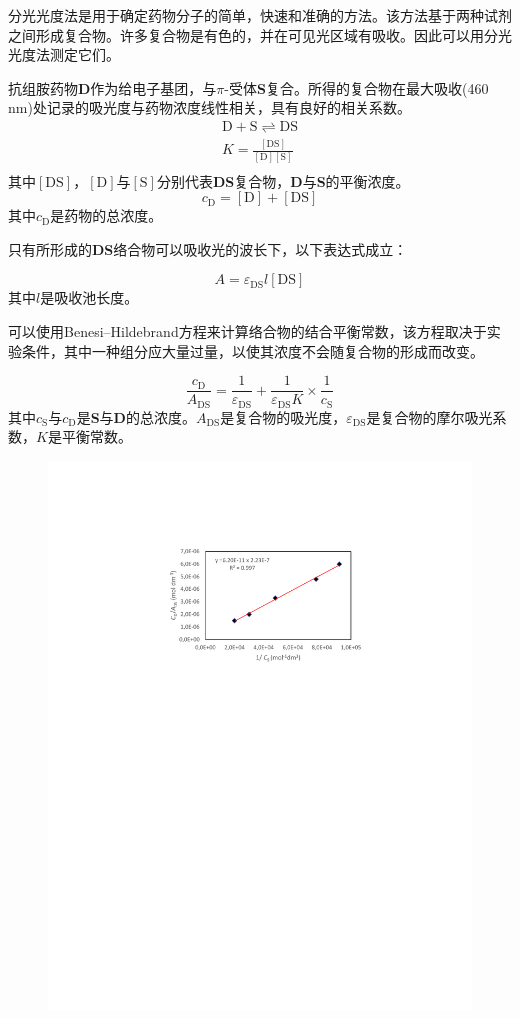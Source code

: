 
分光光度法是用于确定药物分子的简单，快速和准确的方法。该方法基于两种试剂之间形成复合物。许多复合物是有色的，并在可见光区域有吸收。因此可以用分光光度法测定它们。

抗组胺药物\textbf{D}作为给电子基团，与$\pi$-受体\textbf{S}复合。所得的复合物在最大吸收(460 nm)处记录的吸光度与药物浓度线性相关，具有良好的相关系数。
$$
\begin{aligned}
\mathrm D+\mathrm S\rightleftharpoons\mathrm {DS}\\
K=\frac{[\mathrm{DS}]}{[\mathrm D][\mathrm S]}\\
\end{aligned}
$$
其中\([\mathrm{DS}]\)，\([\mathrm D]\)与\([\mathrm S]\)分别代表\textbf{DS}复合物，\textbf{D}与\textbf{S}的平衡浓度。
\[
c_{\mathrm D}=[\mathrm D]+[\mathrm {DS}]
\] 
其中\(c_{\mathrm D}\)是药物的总浓度。

只有所形成的\textbf{DS}络合物可以吸收光的波长下，以下表达式成立：

 \[
A=\varepsilon_{\mathrm{DS}}l[\mathrm{DS}]
\] 
其中\(l\)是吸收池长度。

可以使用Benesi--Hildebrand方程来计算络合物的结合平衡常数，该方程取决于实验条件，其中一种组分应大量过量，以使其浓度不会随复合物的形成而改变。

\[
\frac{c_{\mathrm D}}{A_{\mathrm{DS}}}=\frac{1}{\varepsilon_{\mathrm{DS}}}+\frac{1}{\varepsilon_{\mathrm{DS}}K}\times\frac{1}{c_{\mathrm S}}
\]
其中\(c_{\mathrm S}\)与\(c_{\mathrm D}\)是\textbf{S}与\textbf{D}的总浓度。\(A_{\mathrm{DS}}\)是复合物的吸光度，\(\varepsilon_{\mathrm{DS}}\)是复合物的摩尔吸光系数，\(K\)是平衡常数。

\begin{figure}[h]
	\centering
	\includegraphics[width=12cm]{./pic/t25-1.pdf}
\end{figure}

